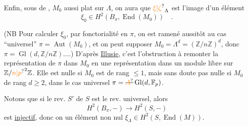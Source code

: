 Enfin, sous  de , $M_0$  aussi plat sur $\Lambda$, on aura que $\unsure{\xi|\zeta}_{\Lambda}$ est l'image d'un élément
\[
\xi_0\in H^2(B_{\pi},\operatorname{End}(M_0))\quad .
\]

(NB Pour calculer $\xi_0$, par fonctorialité en $\pi$, on est ramené aussitôt au cas ``universel'' $\pi=\operatorname{Aut}(M_0)$, et on peut  supposer $M_0=\Lambda^d=(\mathbb Z/n\mathbb Z)^d$, donc $\pi=\operatorname{Gl}(d,\mathbb Z/n\mathbb Z)$....) D'après \uline{Illusie}, c'est l'obstruction à remonter la représentation de $\pi$ dans $M_0$ en une représentation dans un module libre sur $\mathbb Z/\unsure{n|p}^2\mathbb Z$.  Elle est  nulle si $M_0$ est de rang $\leq 1$, mais sans doute pas nulle si $M_0$ de rang $d\geq 2$, dans le cas universel $\pi=\deleted{\unsure{A}}\operatorname{Gl}(d,\mathbb F_p)$.

Notons que si le rev. $S'$ de $S$ est le rev. universel, alors
\[
H^2(B_{\pi},-)\longrightarrow H^2(S,-)
\]
est \uline{injectif}, donc on  un élément non nul  $\xi_{\Lambda}\in H^2(S,\operatorname{End}(M))$.

